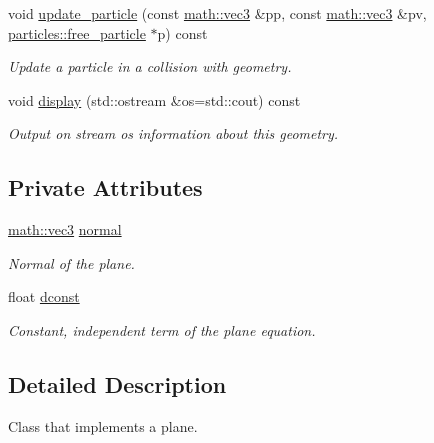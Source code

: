 \begin{DoxyCompactItemize}
void \hyperlink{classphysim_1_1geom_1_1plane_af40afe0d75150a4b45de85a2197137f1}{update\+\_\+particle} (const \hyperlink{structphysim_1_1math_1_1vec3}{math\+::vec3} \&pp, const \hyperlink{structphysim_1_1math_1_1vec3}{math\+::vec3} \&pv, \hyperlink{classphysim_1_1particles_1_1free__particle}{particles\+::free\+\_\+particle} $\ast$p) const
\begin{DoxyCompactList}\small\item\em Update a particle in a collision with geometry. \end{DoxyCompactList}\item 
\mbox{\label{classphysim_1_1geom_1_1plane_aaaf1f8bef6dc8fe9398e5c3a07a123c2}} 
void \hyperlink{classphysim_1_1geom_1_1plane_aaaf1f8bef6dc8fe9398e5c3a07a123c2}{display} (std\+::ostream \&os=std\+::cout) const
\begin{DoxyCompactList}\small\item\em Output on stream {\itshape os} information about this geometry. \end{DoxyCompactList}\end{DoxyCompactItemize}
\subsection*{Private Attributes}
\begin{DoxyCompactItemize}
\item 
\hyperlink{structphysim_1_1math_1_1vec3}{math\+::vec3} \hyperlink{classphysim_1_1geom_1_1plane_ab9502f59c7c72083fe4ab166ad8e637a}{normal}
\begin{DoxyCompactList}\small\item\em Normal of the plane. \end{DoxyCompactList}\item 
\mbox{\label{classphysim_1_1geom_1_1plane_a80867844aac8461bd644cca6de9ef739}} 
float \hyperlink{classphysim_1_1geom_1_1plane_a80867844aac8461bd644cca6de9ef739}{dconst}
\begin{DoxyCompactList}\small\item\em Constant, independent term of the plane equation. \end{DoxyCompactList}\end{DoxyCompactItemize}


\subsection{Detailed Description}
Class that implements a plane. 

